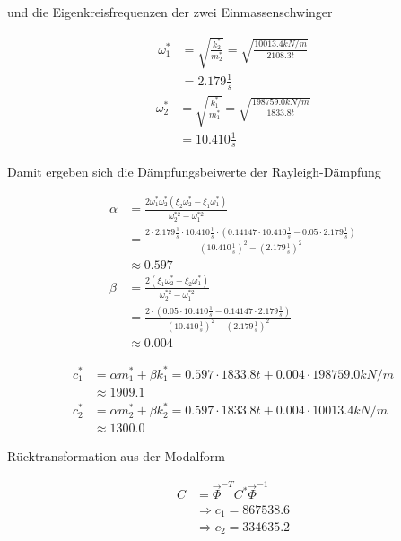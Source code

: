 und die Eigenkreisfrequenzen der zwei Einmassenschwinger

\begin{align*}
\omega_1^* &= \sqrt{\frac{k_2^*}{m_2^*}} = \sqrt{\frac{10013.4 kN/m}{2108.3 t}}\\
           &= 2.179 \frac{1}{s}
\end{align*}
\begin{align*}
\omega_2^* &= \sqrt{\frac{k_1^*}{m_1^*}} = \sqrt{\frac{198759.0 kN/m}{1833.8 t}}\\
           &= 10.410 \frac{1}{s}
\end{align*}

\pagebreak

Damit ergeben sich die Dämpfungsbeiwerte der Rayleigh-Dämpfung

\begin{align*}
\alpha &= \frac{2 \omega_1^* \omega_2^* (\xi_2 \omega_2^* - \xi_1 \omega_1^*)}{\omega_2^{*2} - \omega_1^{*2}}\\
       &= \frac{2 \cdot 2.179 \frac{1}{s} \cdot 10.410 \frac{1}{s} \cdot (0.14147 \cdot 10.410 \frac{1}{s} - 0.05 \cdot 2.179 \frac{1}{s})}{(10.410 \frac{1}{s})^2 - (2.179 \frac{1}{s})^2}\\
       &\approx 0.597\\[2em]
\beta  &= \frac{2 (\xi_1 \omega_2^* - \xi_2 \omega_1^*)}{\omega_2^{*2} - \omega_1^{*2}}\\
       &= \frac{2 \cdot (0.05 \cdot 10.410 \frac{1}{s} - 0.14147 \cdot 2.179 \frac{1}{s})}{(10.410 \frac{1}{s})^2 - (2.179 \frac{1}{s})^2}\\
       &\approx 0.004
\end{align*}

\begin{align*}
c_1^* &= \alpha m_1^* + \beta k_1^* = 0.597 \cdot 1833.8 t + 0.004 \cdot 198759.0 kN/m\\
      &\approx 1909.1\\
c_2^* &= \alpha m_2^* + \beta k_2^* = 0.597 \cdot 1833.8 t + 0.004 \cdot 10013.4 kN/m\\
      &\approx 1300.0
\end{align*}

Rücktransformation aus der Modalform

\begin{align*}
C &= \vec{\Phi}^{-T} C^* \vec{\Phi}^{-1}\\
  &\Rightarrow c_1 = 867538.6\\
  &\Rightarrow c_2 = 334635.2
\end{align*}

